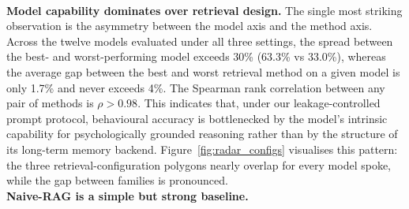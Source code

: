 \documentclass{article}
\begin{document}
\\ \textbf{Model capability dominates over retrieval design.} The single most striking observation is the asymmetry between the model axis and the method axis. Across the twelve models evaluated under all three settings, the spread between the best- and worst-performing model exceeds 30\% (63.3\% vs 33.0\%), whereas the average gap between the best and worst retrieval method on a given model is only 1.7\% and never exceeds 4\%. The Spearman rank correlation between any pair of methods is $\rho > 0.98$. This indicates that, under our leakage-controlled prompt protocol, behavioural accuracy is bottlenecked by the model's intrinsic capability for psychologically grounded reasoning rather than by the structure of its long-term memory backend. Figure~\ref{fig:radar_configs} visualises this pattern: the three retrieval-configuration polygons nearly overlap for every model spoke, while the gap between families is pronounced.
\\ \textbf{Naive-RAG is a simple but strong baseline.} 
\end{document}
